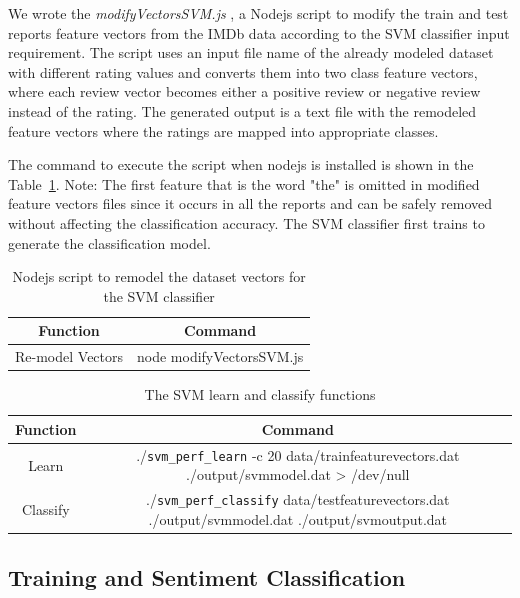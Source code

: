 \documentclass[conference]{IEEEtran}
\begin{document}
We wrote the \emph{modifyVectorsSVM.js} , a Nodejs script to modify the train and test reports feature
vectors from the IMDb data according to the SVM classifier input requirement. The script uses an input
file name of the already modeled dataset with different rating values and converts them into two class
feature vectors, where each review vector becomes either a positive review or negative review instead
of the rating. The generated output is a text file with the remodeled feature vectors where the ratings are mapped into appropriate classes.

The command to execute the script when nodejs is installed is shown in the Table~\ref{table:nodejsScript}.
Note: The first feature that is the word "the" is omitted in modified feature vectors files since it occurs in all the reports and can be safely removed without affecting the classification accuracy.
The SVM classifier first trains to generate the classification model.



\begin{table} 
\centering
\caption{Nodejs script to remodel the dataset vectors for the SVM classifier}	
\begin{tabular}{c c}				
\hline \hline						
Function & Command	\\ 
\hline	
Re-model Vectors	&	node modifyVectorsSVM.js  \\ [1ex]
\hline
\end{tabular}
\label{table:nodejsScript}
\end{table}

\begin{table} 
\centering
\caption{The SVM learn and classify functions}	
\begin{tabular}{c c}				
\hline \hline						
Function & Command	\\ 
\hline	
Learn	 &	./\verb|svm_perf_learn| -c 20 data/trainfeaturevectors.dat ./output/svmmodel.dat > /dev/null  \\
Classify &	./\verb|svm_perf_classify| data/testfeaturevectors.dat ./output/svmmodel.dat ./output/svmoutput.dat \\ [1ex]
\hline
\end{tabular}
\label{table:SVMfunctions}
\end{table}


\subsection{Training and Sentiment Classification}
\end{document}
